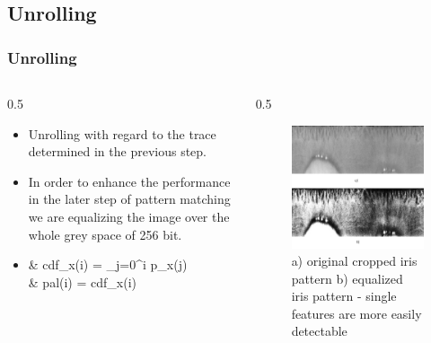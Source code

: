 \documentclass{beamer}
\begin{document}
\subsection{Unrolling} 
\begin{frame}
	[fragile] \frametitle{Unrolling} 
	\begin{columns}
		\begin{column}
			{0.5
			\textwidth} 
			\begin{itemize}
				\item Unrolling with regard to the trace determined in the previous step. 
				\item In order to enhance the performance in the later step of pattern matching we are equalizing the image over the whole grey space of 256 bit. 
				\item 
				\begin{aligned}
					& cdf_x(i) = \sum \limits_{j=0}^{i} p_x(j) \\
					& pal(i) = cdf_x(i) 
				\end{aligned}
			\end{itemize}
		\end{column}
		\begin{column}
			{0.5
			\textwidth} 
			\begin{figure}
				[ht] \centering 
				\includegraphics[width=0.99
				\textwidth]{../report/iris/iris_unrolled.png} \caption{a) original cropped iris pattern b) equalized iris pattern - single features are more easily detectable} \label{fig:unrolled_iris} 
			\end{figure}
		\end{column}
	\end{columns}
\end{frame}
\end{document}
